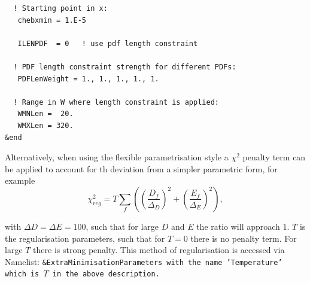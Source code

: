 \begin{description}
\begin{verbatim}
  ! Starting point in x:
   chebxmin = 1.E-5

   ILENPDF  = 0   ! use pdf length constraint

  ! PDF length constraint strength for different PDFs:
   PDFLenWeight = 1., 1., 1., 1., 1.     

  ! Range in W where length constraint is applied:
   WMNLen =  20.
   WMXLen = 320.
&end
\end{verbatim}

Alternatively, when using the flexible parametrisation style a $\chi^2$
penalty term can be applied to account for th deviation from a simpler parametric form, for example
\begin{equation}
\chi^2_{reg}= T\sum_f\left(\left(\frac{D_f}{\Delta_D}\right)^2+ \left(\frac{E_f}{\Delta_E}\right)^2\right),
\end{equation}

with $\Delta D=\Delta E = 100$, such that for large $D$ and $E$ the ratio will approach $1$. 
$T$ is the regularisation parameters, such that for $T=0$ there is no penalty term. 
For large $T$ there is strong penalty.
This method of regularisation is accessed via Namelist: \tt \&ExtraMinimisationParameters \rm
with the name \tt 'Temperature' \rm which is $T$ in the above description.

\end{description}
